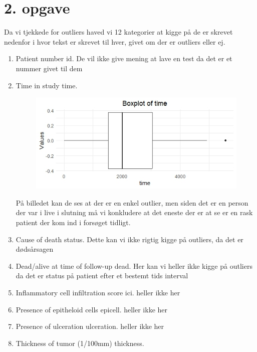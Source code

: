 \chapter{2. opgave}
Da vi tjekkede for outliers haved vi 12 kategorier at kigge på de er skrevet nedenfor i hvor tekst er skrevet til hver, givet om der er outliers eller ej.
\begin{enumerate}
\item Patient number id. \newline
De vil ikke give mening at lave en test da det er et nummer givet til dem 
\item  Time in study time.\\
\begin{figure}[h]
    \centering
    \includegraphics[width=1\linewidth]{Project/BIlleder_Duration/Time_Outliers.jpeg}
\end{figure}
På billedet kan de ses at der er en enkel outlier, men siden det er en person der var i live i slutning må vi konkludere at det eneste der er at se er en rask patient der kom ind i forsøget tidligt.
\item Cause of death status. \newline
Dette kan vi ikke rigtig kigge på outliers, da det er dødsårsagen 
\item Dead/alive at time of follow-up dead. \newline
Her kan vi heller ikke kigge på outliers da det er status på patient efter et bestemt tids interval
\item Inflammatory cell infiltration score ici. \newline
heller ikke her
\item Presence of epitheloid cells epicell. \newline
heller ikke her
\item Presence of ulceration ulceration. \newline
heller ikke her
\item Thickness of tumor (1/100mm) thickness.\\

\end{enumerate}
